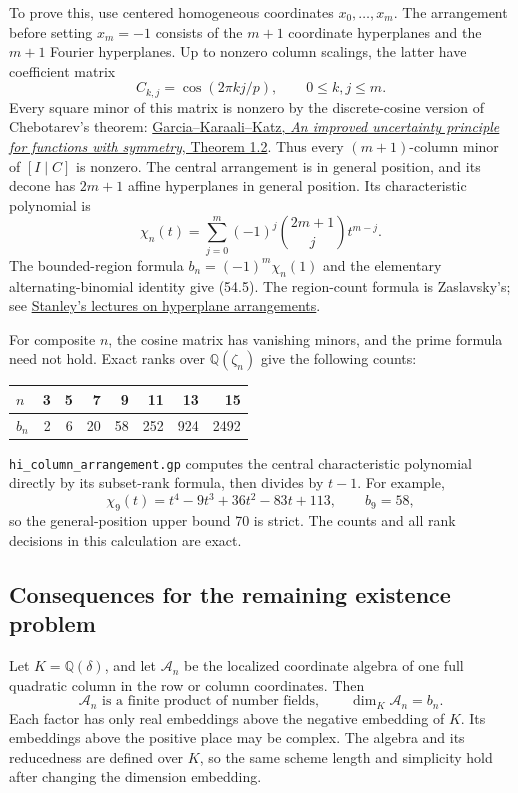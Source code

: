 \documentclass[11pt,reqno]{amsart}
\theoremstyle{plain}
\begin{document}
To prove this, use centered homogeneous coordinates
\(x_0,\ldots,x_m\). The arrangement before setting \(x_m=-1\)
consists of the \(m+1\) coordinate hyperplanes and the \(m+1\)
Fourier hyperplanes. Up to nonzero column scalings, the latter have
coefficient matrix
\[
 C_{k,j}=\cos(2\pi kj/p),\qquad 0\le k,j\le m.
\]
Every square minor of this matrix is nonzero by the discrete-cosine
version of Chebotarev's theorem: \href{https://arxiv.org/abs/1807.07648}{Garcia--Karaali--Katz, \emph{An improved
uncertainty principle for functions with symmetry}, Theorem 1.2}.
Thus every \((m+1)\)-column minor of \([I\mid C]\) is nonzero.
The central arrangement is in general position, and its decone has
\(2m+1\) affine hyperplanes in general position. Its characteristic
polynomial is
\[
 \chi_n(t)=\sum_{j=0}^{m}(-1)^j\binom{2m+1}{j}t^{m-j}.
\]
The bounded-region formula \(b_n=(-1)^m\chi_n(1)\) and the elementary
alternating-binomial identity give (54.5). The region-count formula
is Zaslavsky's; see \href{https://ocw.mit.edu/courses/18-315-combinatorial-theory-hyperplane-arrangements-fall-2004/pages/lecture-notes/}{Stanley's lectures on hyperplane arrangements}.

For composite \(n\), the cosine matrix has vanishing minors, and the
prime formula need not hold. Exact ranks over \(\mathbb Q(\zeta_n)\)
give the following counts:

\begin{center}\small
\begin{tabular}{@{}lrrrrrrr@{}}
\toprule
\(n\) & 3 & 5 & 7 & 9 & 11 & 13 & 15 \\
\midrule
\(b_n\) & 2 & 6 & 20 & 58 & 252 & 924 & 2492 \\
\bottomrule
\end{tabular}
\end{center}

\texttt{hi\_\allowbreak column\_\allowbreak arrangement.gp} computes the central characteristic
polynomial directly by its subset-rank formula, then divides by
\(t-1\). For example,
\[
 \chi_9(t)=t^4-9t^3+36t^2-83t+113,
 \qquad b_9=58,
\]
so the general-position upper bound 70 is strict. The counts and all
rank decisions in this calculation are exact.

\subsection{Consequences for the remaining existence problem}\label{sec:54.3}

Let \(K=\mathbb Q(\delta)\), and let \(\mathcal A_n\) be the
localized coordinate algebra of one full quadratic column in the row
or column coordinates. Then
\begin{equation*}
 \boxed{\displaystyle
 \mathcal A_n\text{ is a finite product of number fields},\qquad
 \dim_K\mathcal A_n=b_n.}\tag{54.6}
\end{equation*}
Each factor has only real embeddings above the negative embedding of
\(K\). Its embeddings above the positive place may be complex.
The algebra and its reducedness are defined over \(K\), so the same
scheme length and simplicity hold after changing the dimension
embedding.
\end{document}
